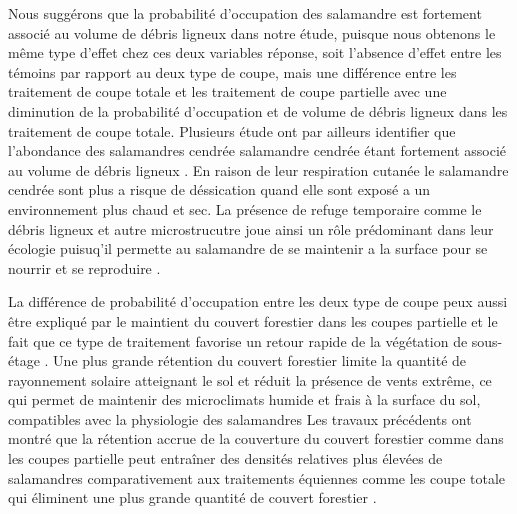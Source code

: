 Nous suggérons que la probabilité d'occupation des salamandre est fortement associé au volume de débris ligneux dans notre étude, puisque nous obtenons le même type d'effet chez ces deux variables réponse, 
soit l'absence d'effet entre les témoins par rapport au deux type de coupe, mais une différence entre les traitement de coupe totale et les traitement de coupe partielle avec une diminution de la probabilité d'occupation et de volume de débris ligneux dans les traitement de coupe totale. 
Plusieurs étude ont par ailleurs identifier que l'abondance des salamandres cendrée salamandre cendrée étant fortement associé au volume de débris ligneux \citep{McKenny2006Effectsstructural,Nolet2018Comparingeffects,Mazerolle2021Woodlandsalamander}. 
En raison de leur respiration cutanée le salamandre cendrée sont plus a risque de déssication quand elle sont exposé a un environnement plus chaud et sec. 
La présence de refuge temporaire comme le débris ligneux et autre microstrucutre joue ainsi un rôle prédominant dans leur écologie puisuq'il permette au salamandre de se maintenir a la surface pour se nourrir et se reproduire \citep{Peterman2014Spatialvariation,Achat2015Quantifyingconsequences,Peele2017Effectswoody}. 


La différence de probabilité d'occupation entre les deux type de coupe peux aussi être expliqué par le maintient du couvert forestier dans les coupes partielle et le fait que ce type de traitement favorise un retour rapide de la végétation de sous-étage \citep{Raybuck2015silviculturalpractices}.
Une plus grande rétention du couvert forestier limite la quantité de rayonnement solaire atteignant le sol et réduit la présence de vents extrême, ce qui permet de maintenir des microclimats humide et frais à la surface du sol, compatibles avec la physiologie des salamandres \citep{Homyack2011Energeticssurfaceactive}
Les travaux précédents ont montré que la rétention accrue de la couverture du couvert forestier comme dans les coupes partielle peut entraîner des densités relatives plus élevées de salamandres 
comparativement aux traitements équiennes comme les coupe totale qui éliminent une plus grande quantité de couvert forestier \citep{Hocking2013Effectsexperimental,Harper2015Impactforestry,Mahoney2016Woodlandsalamander}. 

